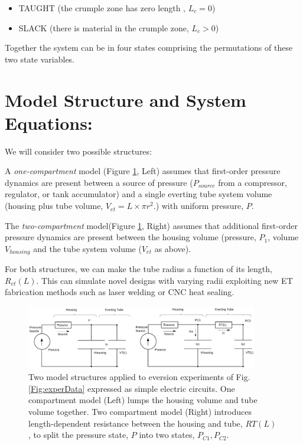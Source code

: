 \documentclass[letterpaper]{article}
\begin{document}
\begin{itemize}
  \item TAUGHT (the crumple zone has zero length , $L_c = 0 $)
  \item SLACK (there is material in the crumple zone, $L_c > 0$)
\end{itemize}

Together the system can be in four states comprising the permutations
of these two state variables.

\section{Model Structure and System Equations:}

We will consider two possible structures:

A {\it one-compartment} model (Figure \ref{Fig:TwoStructures}, Left)
assumes that first-order pressure dynamics are present between a source of   pressure  ($P_{source}$ from a compressor, regulator, or tank accumulator)
and a single  everting tube system volume (housing plus tube volume, $V_{et} = L\times \pi r^2$.) with uniform pressure, $P$.

The {\it two-compartment} model(Figure \ref{Fig:TwoStructures}, Right)
assumes that additional first-order pressure dynamics are present between
the housing volume (pressure, $P_1$, volume $V_{housing}$ and the tube system volume ($V_{et}$ as above).

For both structures, we can make the tube radius a function of its length, $R_{et}(L)$.   This can simulate novel designs with varying
radii exploiting new ET
fabrication methods such as laser welding or CNC heat sealing.

\begin{figure}[h]\centering
\includegraphics[width=0.9\textwidth]{Fig_OneAndTwoCompartment.png}
\caption{Two model structures applied to eversion experiments of
Fig. \ref{Fig:experData} expressed as simple electric circuits.
One compartment model (Left) lumps the
housing volume and tube volume together. Two compartment model (Right)
introduces length-dependent resistance between the housing and tube, $RT(L)$, to split the pressure state, $P$ into two states, $P_{C1}, P_{C2}$.}\label{Fig:TwoStructures}
\end{figure}
\end{document}
